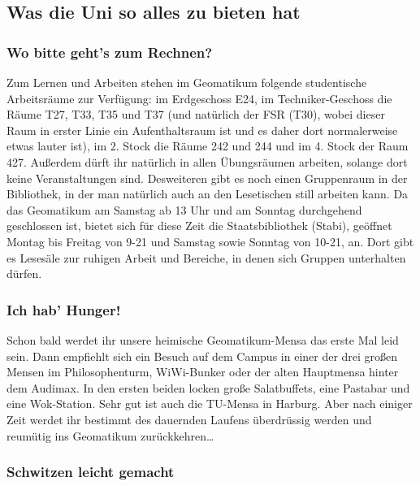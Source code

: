 \subsection{Was die Uni so alles zu bieten hat}

\subsubsection{Wo bitte geht's zum Rechnen?}


Zum Lernen und Arbeiten stehen im Geomatikum folgende studentische Arbeitsräume
zur Verfügung: im Erdgeschoss E24, im Techniker-Geschoss die Räume T27, T33,
T35 und T37 (und natürlich der FSR (T30), wobei dieser Raum in erster Linie ein
Aufenthaltsraum ist und es daher dort normalerweise etwas lauter ist), im 2.
Stock die Räume 242 und 244 und im 4. Stock der Raum 427. Außerdem dürft ihr
natürlich in allen Übungsräumen arbeiten, solange dort keine Veranstaltungen
sind. Desweiteren gibt es noch einen Gruppenraum in der Bibliothek, in der man
natürlich auch an den Lesetischen still arbeiten kann. Da das Geomatikum am
Samstag ab 13 Uhr und am Sonntag durchgehend geschlossen ist, bietet sich für
diese Zeit die Staatsbibliothek (Stabi), geöffnet Montag bis Freitag von 9-21
und Samstag sowie Sonntag von 10-21, an. Dort gibt es Lesesäle zur ruhigen
Arbeit und Bereiche, in denen sich Gruppen unterhalten dürfen.

\subsubsection{Ich hab' Hunger!}

Schon bald werdet ihr unsere heimische Geomatikum-Mensa das erste Mal leid
sein. Dann empfiehlt sich ein Besuch auf dem Campus in einer der drei großen
Mensen im Philosophenturm, WiWi-Bunker oder der alten Hauptmensa hinter dem
Audimax. In den ersten beiden locken große Salatbuffets, eine Pastabar und eine
Wok-Station. Sehr gut ist auch die TU-Mensa in Harburg. Aber nach einiger Zeit
werdet ihr bestimmt des dauernden Laufens überdrüssig werden und reumütig ins
Geomatikum zurückkehren\ldots

\subsubsection{Schwitzen leicht gemacht}


